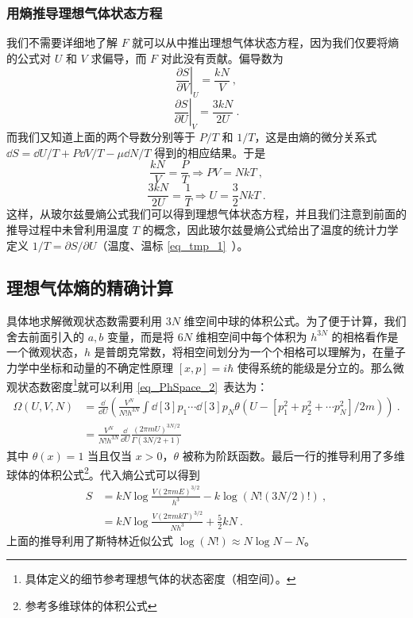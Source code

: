 \subsubsection{用熵推导理想气体状态方程}
我们不需要详细地了解 $F$ 就可以从中推出理想气体状态方程，因为我们仅要将熵的公式对 $U $ 和 $V$ 求偏导，而 $F$ 对此没有贡献。偏导数为
\begin{equation}
\left. \frac{\partial S}{\partial V} \right |_{U}^{}=\frac{kN}{V}~,
\end{equation}
\begin{equation}
\left. \frac{\partial S}{\partial U}\right |_{V}^{}=\frac{3kN}{2U}~.
\end{equation}
而我们又知道上面的两个导数分别等于 $P/T$ 和 $1/T$，这是由熵的微分关系式 $\dd S=\dd U/T+P\dd V/T-\mu \dd N/T$ 得到的相应结果。于是
\begin{equation}
\dfrac{kN}{V}=\dfrac{P}{T}\Rightarrow PV=NkT~,
\end{equation}
\begin{equation}
\dfrac{3kN}{2U} = \dfrac{1}{T}\Rightarrow U=\frac{3}{2}NkT~.
\end{equation}
这样，从玻尔兹曼熵公式我们可以得到理想气体状态方程，并且我们注意到前面的推导过程中未曾利用温度 $T$ 的概念，因此玻尔兹曼熵公式给出了温度的统计力学定义 $1/T=\partial S/\partial U$（温度、温标 \autoref{eq_tmp_1}~）。
\subsection{理想气体熵的精确计算}
具体地求解微观状态数需要利用 $3N$ 维空间中球的体积公式。为了便于计算，我们舍去前面引入的 $a,b$ 变量，而是将 $6N$ 维相空间中每个体积为 $h^{3N}$ 的相格看作是一个微观状态，$h$ 是普朗克常数，将相空间划分为一个个相格可以理解为，在量子力学中坐标和动量的不确定性原理 $[x,p]=i\hbar$ 使得系统的能级是分立的。那么微观状态数密度\footnote{具体定义的细节参考理想气体的状态密度（相空间）。}就可以利用 \autoref{eq_PhSpace_2}~表达为：
\begin{equation}
\begin{aligned}
\Omega(U,V,N)&=\frac{\dd }{\dd U}\left(\frac{V^N}{N! h^{3N}}\int \dd[3]{p_1}\cdots \dd[3]{p_N} \theta(U-[p_1^2+p_2^2+\cdots p_N^2]/2m)\right) ~.
\\
&=\frac{V^N}{N! h^{3N}} \frac{\dd}{\dd U} \frac{(2\pi m U)^{3N/2}}{\Gamma(3N/2+1)}
\end{aligned}
\end{equation}
其中 $\theta(x)=1$ 当且仅当 $x>0$，$\theta$ 被称为阶跃函数。最后一行的推导利用了多维球体的体积公式\footnote{参考多维球体的体积公式 }。代入熵公式可以得到
\begin{equation}
\begin{aligned}
S&=kN\log \frac{V(2\pi mE)^{3/2}}{h^3}-k\log (N! (3N/2)!)~,
\\
&=kN\log \frac{V(2\pi m kT)^{3/2}}{Nh^3}+\frac{5}{2}kN ~.
\end{aligned}
\end{equation}
上面的推导利用了斯特林近似公式 $\log(N!)\approx N\log N-N$。

